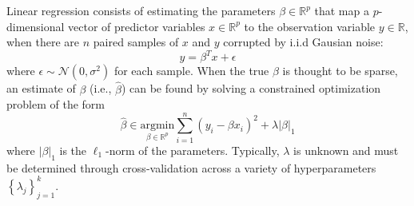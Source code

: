 \documentclass[letterpaper, 10 pt, conference]{ieeeconf}  %
\begin{document}
Linear regression consists of estimating the parameters $\beta \in \mathbb{R}^p$ that map a $p$-dimensional vector of predictor variables $x \in \mathbb{R}^p$ to the observation variable $y\in \mathbb{R}$, when there are $n$ paired samples of $x$ and $y$ corrupted by i.i.d Gausian noise:
$$
y = \beta^T x + \epsilon
$$
where $\epsilon \sim \mathcal{N}(0, \sigma^2)$ for each sample. When the true $\beta$ is thought to be sparse, an estimate of $\beta$ (i.e., $\hat{\beta}$) can be found by solving a constrained optimization problem of the form
$$
\hat{\beta} \in \underset{\beta\in \mathbb{R}^p}{\text{argmin}} \sum_{i=1}^n(y_i - \beta x_i)^2 + \lambda |\beta|_1
$$
where $|\beta|_1$ is the $\ell_1$-norm of the parameters. Typically, $\lambda$ is unknown and must be determined through cross-validation across a variety of hyperparameters $\left\{\lambda_j\right\}_{j=1}^k$.
\end{document}
